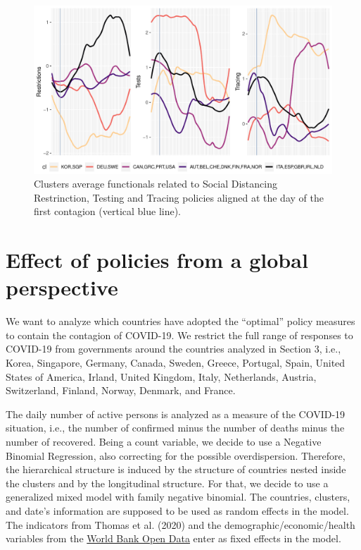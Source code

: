 \documentclass[
  6pt,
]{article}
\begin{document}
\begin{figure}

{\centering \includegraphics{Report_SC_Group3_files/figure-latex/figs3-1} 

}

\caption{\label{fig:figs3}Clusters average functionals related to Social Distancing Restrinction, Testing and Tracing policies aligned at the day of the first contagion (vertical blue line).}\label{fig:figs3}
\end{figure}

\hypertarget{effect-of-policies-from-a-global-perspective}{%
\section{Effect of policies from a global
perspective}\label{effect-of-policies-from-a-global-perspective}}

We want to analyze which countries have adopted the ``optimal'' policy
measures to contain the contagion of COVID-19. We restrict the full
range of responses to COVID-19 from governments around the countries
analyzed in Section 3, i.e., Korea, Singapore, Germany, Canada, Sweden,
Greece, Portugal, Spain, United States of America, Irland, United
Kingdom, Italy, Netherlands, Austria, Switzerland, Finland, Norway,
Denmark, and France.

The daily number of active persons is analyzed as a measure of the
COVID-19 situation, i.e., the number of confirmed minus the number of
deaths minus the number of recovered. Being a count variable, we decide
to use a Negative Binomial Regression, also correcting for the possible
overdispersion. Therefore, the hierarchical structure is induced by the
structure of countries nested inside the clusters and by the
longitudinal structure. For that, we decide to use a generalized mixed
model with family negative binomial. The countries, clusters, and date's
information are supposed to be used as random effects in the model. The
indicators from Thomas et al. (2020) and the demographic/economic/health
variables from the \href{https://data.worldbank.org/}{World Bank Open
Data} enter as fixed effects in the model.
\end{document}
